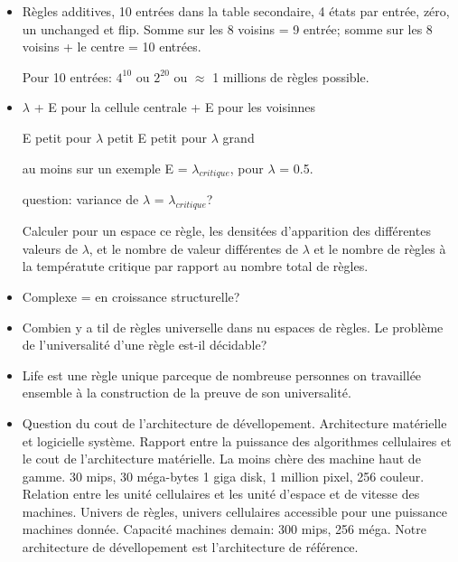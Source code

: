 \begin{itemize}
  \begin{itemize}
  \item filtre, langage, batch
  \item shell
  \item click and point
  \end{itemize}

  langage = lex, yacc matlab - txl; shell = sh, tcl; %
  tcl = langage; tcl + tk = click and point; %
  methodologie objet, tcl + itcl = objet; athena widget = trop fig\'e,
  trop lourd. %
  Mod\`ele click an point = khoros. %
  Alternative: objet c ou c++, tcl et widget tk; %
  shell = devellopement; %
  langage = maturation; visualisation = something.
  
\item%
  R\`egles additives, 10 entr\'ees dans la table secondaire,
  4 \'etats par entr\'ee, z\'ero, un unchanged et flip. %
  Somme sur les 8 voisins = 9 entr\'ee; %
  somme sur les 8 voisins + le  centre = 10 entr\'ees.
  
  Pour 10 entr\'ees: $4^{10}$ ou $2^{20}$ ou $\approx$ 1 millions de
  r\`egles possible.
  
\item%
  $\lambda$ + E pour la cellule centrale + E pour les voisinnes
  
  E petit pour $\lambda$ petit
  E petit pour $\lambda$ grand
  
  au moins sur un exemple E = $\lambda_{critique}$, pour $\lambda$ = 0.5.
  
  question: variance de $\lambda$ = $\lambda_{critique}$?
  
  Calculer pour un espace ce r\`egle, les densit\'ees d'apparition des
  diff\'erentes valeurs de $\lambda$, et le nombre de valeur diff\'erentes
  de $\lambda$ et le nombre de r\`egles \`a la temp\'eratute critique par
  rapport au nombre total de r\`egles.

\item Complexe = en croissance structurelle?

\item Combien y a til de r\`egles universelle dans nu espaces de r\`egles. %
  Le probl\`eme de l'universalit\'e d'une r\`egle est-il d\'ecidable?

\item Life est une r\`egle unique parceque de nombreuse personnes on
  travaill\'ee ensemble \`a la construction de la preuve de son
  universalit\'e.

\item%
  Question du cout de l'architecture de d\'evellopement. %
  Architecture mat\'erielle et logicielle syst\`eme. %
  Rapport entre la puissance des algorithmes cellulaires et le cout
  de l'architecture mat\'erielle. %
  La moins ch\`ere des machine haut de gamme. %
  30 mips, 30 m\'ega-bytes 1 giga disk, 1 million pixel, 256 couleur. %
  Relation entre les unit\'e cellulaires et les unit\'e d'espace
  et de vitesse des machines. %
  Univers de r\`egles, univers cellulaires accessible pour une puissance
  machines donn\'ee. %
  Capacit\'e machines demain: 300 mips, 256 m\'ega. %
  Notre architecture de d\'evellopement est l'architecture de r\'ef\'erence. %


\end{itemize}
